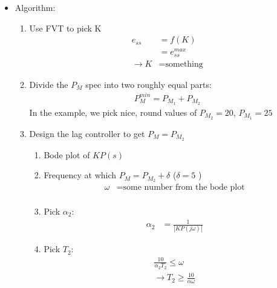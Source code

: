 \begin{enumerate}
\begin{enumerate}
\begin{itemize}
                    \item Algorithm:
                        \begin{enumerate}
                            \item Use FVT to pick K
                                \begin{align*}
                                    e_{ss} &= f(K) \\
                                    &= e_{ss}^{max} \\
                                    \rightarrow K &= \text{something}
                                \end{align*}
                            \item Divide the $P_M$ spec into two roughly equal parts:
                                \begin{align*}
                                    P_M^{min} = P_{M_1} + P_{M_2}
                                \end{align*}
                                In the example, we pick nice, round values of $P_{M_2} = 20$, $P_{M_1} = 25$
                            \item Design the lag controller to get $P_M = P_{M_2}$
                                \begin{enumerate}
                                    \item Bode plot of $KP(s)$
                                    \item Frequency at which $P_M = P_{M_2} + \delta$ ($\delta = 5$ \textdegree)
                                        \begin{align*}
                                            \omega  &= \text{some number from the bode plot} \\
                                        \end{align*}

                                    \item Pick $\alpha_2$:
                                        \begin{align*}
                                            \alpha_2 &= \frac{1}{|KP(j \omega)|}
                                        \end{align*}
                                    \item Pick $T_2$:
                                        \begin{align*}
                                            \frac{10}{\alpha_2 T_2} \le \omega \\
                                            \rightarrow T_2 \ge \frac{10}{\alpha \omega}
                                        \end{align*}


\end{enumerate}
\end{enumerate}
\end{itemize}
\end{enumerate}
\end{enumerate}
